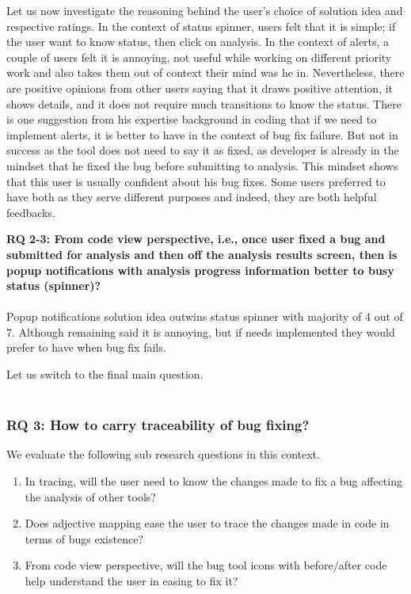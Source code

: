 Let us now investigate the reasoning behind the user’s choice of solution idea and respective ratings. In the context of status spinner, users felt that it is simple; if the user want to know status, then click on analysis. In the context of alerts, a couple of users felt it is annoying, not useful while working on different priority work and also takes them out of context their mind was he in. Nevertheless, there are positive opinions from other users saying that it draws positive attention, it shows details, and it does not require much transitions to know the status. There is one suggestion from his expertise background in coding that if we need to implement alerts, it is better to have in the context of bug fix failure. But not in success as the tool does not need to say it as fixed, as developer is already in the mindset that he fixed the bug before submitting to analysis. This mindset shows that this user is usually confident about his bug fixes. Some users preferred to have both as they serve different purposes and indeed, they are both helpful feedbacks. \\

\begin{myboxi}{{\textbf{RQ 2-3: From code view perspective, i.e., once user fixed a bug and submitted for analysis and then off the analysis results screen, then is popup notifications with analysis progress information better to busy status (spinner)?}}}
\\ \\	Popup notifications solution idea outwins status spinner with majority of 4 out of 7. Although remaining said it is annoying, but if needs implemented they would prefer to have when bug fix fails.
\end{myboxi}

Let us switch to the final main question. \\ \\

\subsubsection{RQ 3: How to carry traceability of bug fixing?}

We evaluate the following sub research questions in this context. \\

\begin{enumerate}
\item In tracing, will the user need to know the changes made to fix a bug affecting the analysis of other tools?
\item Does adjective mapping ease the user to trace the changes made in code in terms of bugs existence?
\item From code view perspective, will the bug tool icons with before/after code help understand the user in easing to fix it?
\end{enumerate}

